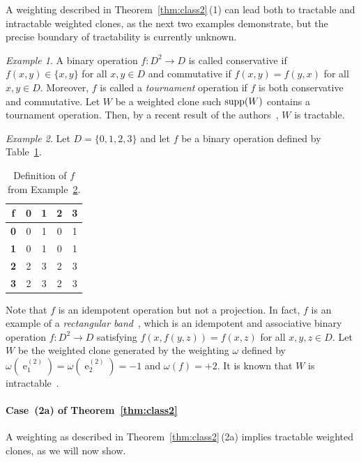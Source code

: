 \documentclass[11pt, reqno]{article}
\DeclareMathOperator{\proj}{\ensuremath{e}}
\DeclareMathOperator{\supp}{{\rm supp}}
\theoremstyle{remark}
\newtheorem{example}{Example}
\begin{document}
A weighting described in Theorem~\ref{thm:class2}\,(1) can lead both to
tractable and intractable weighted clones, as the next two examples demonstrate,
but the precise boundary of tractability is currently unknown.

\begin{example}\label{ex:TP}
A binary operation $f:D^2\rightarrow D$ is called conservative if $f(x,y)\in\{x,y\}$ for all $x,y\in D$ and commutative if $f(x,y)=f(y,x)$ for
all $x,y\in D$. Moreover, $f$ is called a \emph{tournament} operation if $f$ is both conservative
and commutative. Let $W$ be a weighted clone such $\supp(W)$ contains a
tournament operation. Then, by a recent result of the
authors~\cite{tz15:icalp}, $W$ is tractable.
\end{example}

\begin{example}\label{ex:f}
%
Let $D=\{0,1,2,3\}$ and let $f$ be a binary operation defined by 
Table~\ref{table:bin}.
%
\begin{table}[hbt]
\begin{center}
\begin{tabular}{c|cccc}
\textbf{f} & \textbf{0} & \textbf{1} & \textbf{2} & \textbf{3} \\ \hline
\textbf{0} & 0 & 1 & 0 & 1 \\
\textbf{1} & 0 & 1 & 0 & 1 \\
\textbf{2} & 2 & 3 & 2 & 3 \\
\textbf{3} & 2 & 3 & 2 & 3 
\end{tabular}
\end{center}
\caption{Definition of $f$ from Example~\ref{ex:f}.}
\label{table:bin}
\end{table}
%
Note that $f$ is an idempotent operation but not a projection. In fact, $f$ is
an example of a \emph{rectangular band}~\cite{McKenzie87:algebras},
which is an idempotent and associative binary operation $f:D^2\to D$ satisfying
$f(x,f(y,z))=f(x,z)$ for all $x,y,z\in D$. Let $W$ be the weighted clone
generated by the weighting $\omega$ defined by
$\omega(\proj^{(2)}_1)=\omega(\proj^{(2)}_2)=-1$ and $\omega(f)=+2$. It is known
that $W$ is intractable~\cite{Jeavons97:closure,Pearson97:survey}.
%
\end{example}


\paragraph{Case~(2a) of Theorem~\ref{thm:class2}}

A weighting as described in Theorem~\ref{thm:class2}\,(2a) implies tractable
weighted clones, as we will now show.
\end{document}
